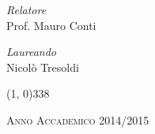 \begin{titlepage}
\begin{center}
\vspace{40pt} 

\begin{large}
\begin{flushleft}
\textit{Relatore}\\ 
\vspace{5pt} 
Prof. Mauro Conti
\end{flushleft}

\vspace{0pt} 

\begin{flushright}
\textit{Laureando}\\ 
\vspace{5pt} 
Nicolò Tresoldi
\end{flushright}
\end{large}

\vspace{40pt}

\line(1, 0){338} \\
\begin{normalsize}
\textsc{Anno Accademico 2014/2015}
\end{normalsize}

\end{center}
\end{titlepage} 